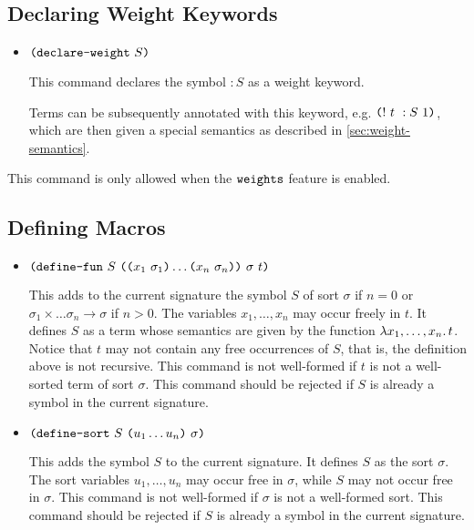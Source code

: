 \documentclass[english,a4paper,10pt]{article}
\begin{document}
\subsection{Declaring Weight Keywords}
\label{ssec:declaring-weights}

\begin{itemize}
\item $\texttt{(}\texttt{declare-weight}\mbox{ }S\texttt{)}$

This command declares the symbol $:S$ as a weight keyword.

Terms can be subsequently annotated
with this keyword, e.g. $\texttt{(}!\mbox{ }t\mbox{ }:S\mbox{ }1\texttt{)}$,
which are then given a special semantics as described in \cref{sec:weight-semantics}.

\end{itemize}
This command is only allowed when the $\texttt{weights}$ feature is enabled.

\subsection{Defining Macros}

\begin{itemize}
\item $\texttt{(}\texttt{define-fun}\mbox{ }S\mbox{ }\texttt{(}\texttt{(}x_1\mbox{ }\sigma_1\texttt{)} \ldots \texttt{(}x_n\mbox{ }\sigma_n\texttt{)}\texttt{)}\mbox{ }\sigma\mbox{ }t\texttt{)}$

This adds to the current signature
the symbol $S$ of sort $\sigma$
if $n=0$ or $\sigma_1 \times \ldots \sigma_n \rightarrow \sigma$ if $n>0$.
The variables $x_1, \ldots, x_n$ may occur freely in $t$.
It defines $S$ as a term whose semantics are given by the function
$\lambda x_1, \ldots, x_n \ldotp t$.
Notice that $t$ may not contain any free occurrences of $S$,
that is, the definition above is not recursive.
This command is not well-formed if $t$ is not a well-sorted
term of sort $\sigma$.
This command should be rejected if $S$ is already
a symbol in the current signature.

\item $\texttt{(}\texttt{define-sort}\mbox{ }S\mbox{ }\texttt{(}u_1 \ldots u_n\texttt{)}\mbox{ }\sigma\texttt{)}$

This adds the symbol $S$ to the current signature.
It defines $S$ as the sort $\sigma$.
The sort variables $u_1, \ldots, u_n$
may occur free in $\sigma$,
while $S$ may not occur free in $\sigma$.
This command is not well-formed if $\sigma$
is not a well-formed sort.
This command should be rejected if $S$ is already
a symbol in the current signature.

\end{itemize}
\end{document}

